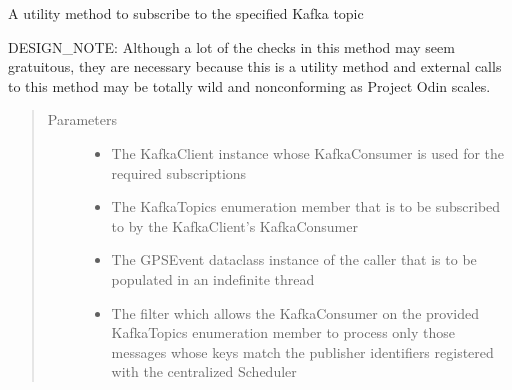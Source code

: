 \documentclass[letterpaper,10pt,english]{sphinxmanual}
\begin{document}
\begin{fulllineitems}
\label{\detokenize{Forge:Forge.gps_subscribe}}
\sphinxAtStartPar
A utility method to subscribe to the specified Kafka topic

\sphinxAtStartPar
DESIGN\_NOTE: Although a lot of the checks in this method may seem gratuitous, they are necessary because this
is a utility method and external calls to this method may be totally wild and non\sphinxhyphen{}conforming as Project
Odin scales.
\begin{quote}\begin{description}
\item[{Parameters}] \leavevmode\begin{itemize}
\item {} 
\sphinxAtStartPar
{} \textendash{} The KafkaClient instance whose KafkaConsumer is used for the required subscriptions

\item {} 
\sphinxAtStartPar
{} \textendash{} The KafkaTopics enumeration member that is to be subscribed to by the KafkaClient’s KafkaConsumer

\item {} 
\sphinxAtStartPar
{} \textendash{} The GPSEvent dataclass instance of the caller that is to be populated in an indefinite thread

\item {} 
\sphinxAtStartPar
{} \textendash{} The filter which allows the KafkaConsumer on the provided KafkaTopics enumeration member
to process only those messages whose keys match the publisher identifiers registered with
the centralized Scheduler


\end{itemize}
\end{description}
\end{quote}
\end{fulllineitems}
\end{document}

